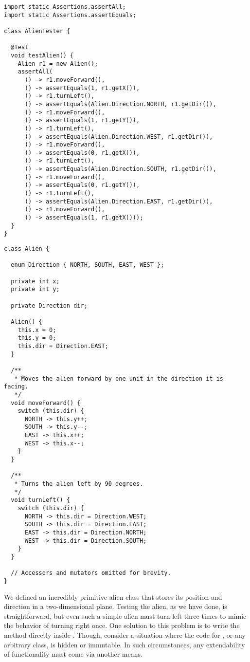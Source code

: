 \begin{lstlisting}[language=MyJava]
import static Assertions.assertAll;
import static Assertions.assertEquals;

class AlienTester {

  @Test
  void testAlien() {
    Alien r1 = new Alien();
    assertAll(
      () -> r1.moveForward(),
      () -> assertEquals(1, r1.getX()),
      () -> r1.turnLeft(),
      () -> assertEquals(Alien.Direction.NORTH, r1.getDir()),
      () -> r1.moveForward(),
      () -> assertEquals(1, r1.getY()),
      () -> r1.turnLeft(),
      () -> assertEquals(Alien.Direction.WEST, r1.getDir()),
      () -> r1.moveForward(),
      () -> assertEquals(0, r1.getX()),
      () -> r1.turnLeft(),
      () -> assertEquals(Alien.Direction.SOUTH, r1.getDir()),
      () -> r1.moveForward(),
      () -> assertEquals(0, r1.getY()),
      () -> r1.turnLeft(),
      () -> assertEquals(Alien.Direction.EAST, r1.getDir()),
      () -> r1.moveForward(),
      () -> assertEquals(1, r1.getX()));
  }
}
\end{lstlisting}

\enlargethispage{3\baselineskip}
\begin{lstlisting}[language=MyJava]
class Alien {

  enum Direction { NORTH, SOUTH, EAST, WEST };

  private int x;
  private int y;

  private Direction dir;

  Alien() {
    this.x = 0;
    this.y = 0;
    this.dir = Direction.EAST;
  }

  /**
   * Moves the alien forward by one unit in the direction it is facing.
   */
  void moveForward() {
    switch (this.dir) {
      NORTH -> this.y++;
      SOUTH -> this.y--;
      EAST -> this.x++;
      WEST -> this.x--;
    }
  }

  /**
   * Turns the alien left by 90 degrees.
   */
  void turnLeft() {
    switch (this.dir) {
      NORTH -> this.dir = Direction.WEST;
      SOUTH -> this.dir = Direction.EAST;
      EAST -> this.dir = Direction.NORTH;
      WEST -> this.dir = Direction.SOUTH;
    }
  }

  // Accessors and mutators omitted for brevity.
}
\end{lstlisting}

We defined an incredibly primitive alien class that stores its position and direction in a two-dimensional plane. 
Testing the alien, as we have done, is straightforward, but even such a simple alien must turn left three times to mimic the behavior of turning right once. 
One solution to this problem is to write the  method directly inside . 
Though, consider a situation where the code for , or any arbitrary class, is hidden or immutable. 
In such circumstances, any extendability of functionality must come via another means. 

